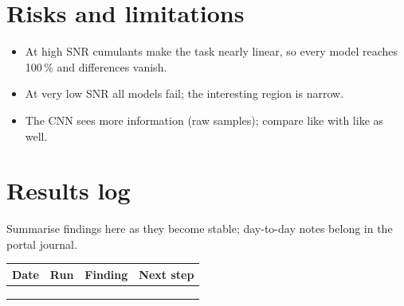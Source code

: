 \documentclass[11pt,a4paper]{article}
\begin{document}
\section{Risks and limitations}
\begin{itemize}
  \item At high SNR cumulants make the task nearly linear, so every model reaches 100\,\% and differences vanish.
  \item At very low SNR all models fail; the interesting region is narrow.
  \item The CNN sees more information (raw samples); compare like with like as well.
\end{itemize}

\section{Results log}
\label{sec:log}
Summarise findings here as they become stable; day-to-day notes belong in the portal journal.

\begin{table}[h]
\centering\small
\begin{tabularx}{\linewidth}{@{}l l >{\raggedright}X >{\raggedright\arraybackslash}X@{}}
\toprule
Date & Run & Finding & Next step \\
\midrule
 & & & \\
 & & & \\
 & & & \\
\bottomrule
\end{tabularx}
\end{table}



\end{document}
